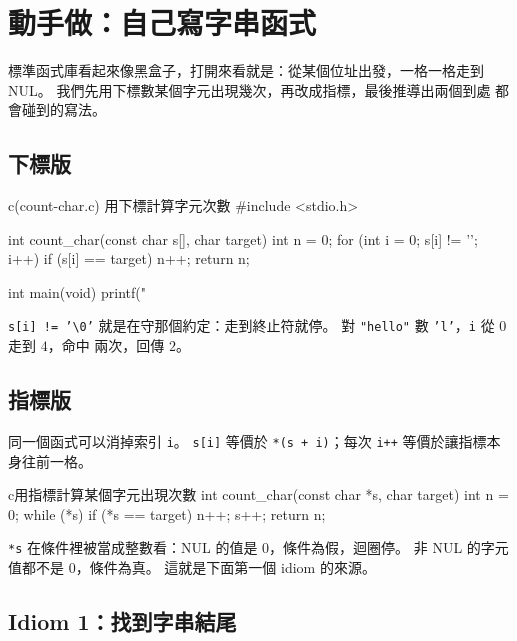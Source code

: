 \section{動手做：自己寫字串函式}
\label{sec:str-diy-functions}

標準函式庫看起來像黑盒子，打開來看就是：從某個位址出發，一格一格走到
NUL。 我們先用下標數某個字元出現幾次，再改成指標，最後推導出兩個到處
都會碰到的寫法。

\subsection{下標版}

\begin{example}{c}{(count-char.c) 用下標計算字元次數}
#include <stdio.h>

int count_char(const char s[], char target) {
    int n = 0;
    for (int i = 0; s[i] != '\0'; i++) {
        if (s[i] == target) {
            n++;
        }
    }
    return n;
}

int main(void) {
    printf("%
}
\end{example}


\texttt{s[i] != '\textbackslash 0'} 就是在守那個約定：走到終止符就停。
對 \texttt{"hello"} 數 \texttt{'l'}，\texttt{i} 從 $0$ 走到 $4$，命中
兩次，回傳 $2$。

\subsection{指標版}

同一個函式可以消掉索引 \texttt{i}。 \texttt{s[i]} 等價於
\texttt{*(s + i)}；每次 \texttt{i++} 等價於讓指標本身往前一格。

\begin{code}{c}{用指標計算某個字元出現次數}
int count_char(const char *s, char target) {
    int n = 0;
    while (*s) {
        if (*s == target) {
            n++;
        }
        s++;
    }
    return n;
}
\end{code}

\texttt{*s} 在條件裡被當成整數看：NUL 的值是 $0$，條件為假，迴圈停。
非 NUL 的字元值都不是 $0$，條件為真。 這就是下面第一個 idiom 的來源。

\subsection{Idiom 1：找到字串結尾}

